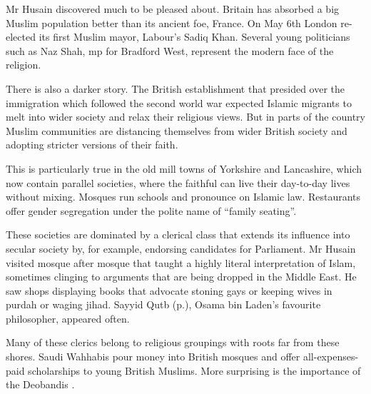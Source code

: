 Mr Husain discovered much to be pleased about. Britain has absorbed a big Muslim population better than its ancient foe, France. On May 6th London re-elected its first Muslim mayor, Labour’s Sadiq Khan. Several young politicians such as Naz Shah, mp for Bradford West, represent the modern face of the religion.

There is also a darker story. The British establishment that presided over the immigration which followed the second world war expected Islamic migrants to melt into wider society and relax their religious views. But in parts of the country Muslim communities are distancing themselves from wider British society and adopting stricter versions of their faith.

This is particularly true in the old mill towns of Yorkshire and Lancashire, which now contain parallel societies, where the faithful can live their day-to-day lives without mixing. Mosques run schools and pronounce on Islamic law. Restaurants offer gender segregation under the polite name of “family seating”.

These societies are dominated by a clerical class that extends its influence into secular society by, for example, endorsing candidates for Parliament. Mr Husain visited mosque after mosque that taught a highly literal interpretation of Islam, sometimes clinging to arguments that are being dropped in the Middle East. He saw shops displaying books that advocate stoning gays or keeping wives in purdah or waging jihad. Sayyid Qutb (p.\pageref{theol:SayyidQutb}), Osama bin Laden’s favourite philosopher, appeared often.

Many of these clerics belong to religious groupings with roots far from these shores. Saudi Wahhabis pour money into British mosques and offer all-expenses-paid scholarships to young British Muslims. More surprising is the importance of the Deobandis . 

